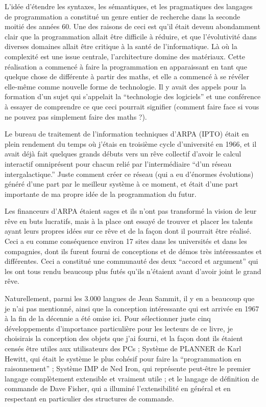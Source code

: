 \documentclass[a4paper,10pt,twoside]{book}
\begin{document}
L'id\'ee d'\'etendre les syntaxes, les s\'emantiques, et les pragmatiques des langages de programmation a constitu\'e un genre entier de recherche dans la seconde moiti\'e des ann\'ees 60. Une des raisons de ceci est qu'il \'etait devenu abondamment clair que la programmation allait \^etre difficile \`a r\'eduire, et que l'\'evolutivit\'e dans diverses domaines allait \^etre critique \`a la sant\'e de l'informatique. L\`a o\`u la complexit\'e est une issue centrale, l'architecture domine des mat\'eriaux. Cette r\'ealisation a commenc\'e \`a faire la programmation en apparaissant en tant que quelque chose de diff\'erente \`a partir des maths, et elle a commenc\'e \`a se r\'ev\'eler elle-m\^eme comme nouvelle forme de technologie. Il y avait des appels pour la formation d'un sujet qui s'appelait la ``technologie des logiciels'' et une conf\'erence \`a essayer de comprendre ce que ceci pourrait signifier (comment faire face si vous ne pouvez pas simplement faire des maths ?).


Le bureau de traitement de l'information techniques d'ARPA (IPTO) \'etait en plein rendement du temps o\`u j'\'etais en troisi\`eme cycle d'universit\'e en 1966, et il avait d\'ej\`a fait quelques grands d\'ebuts vers un r\^eve collectif d'avoir le calcul interactif omnipr\'esent pour chacun reli\'e par l'interm\'ediaire ``d'un r\'eseau intergalactique.'' Juste comment cr\'eer ce r\'eseau (qui a eu d'\'enormes \'evolutions) g\'en\'er\'e d'une part par le meilleur syst\`eme \`a ce moment, et \'etait d'une part importante de ma propre id\'ee de la programmation du futur.

Les financeurs d'ARPA \'etaient sages et ils n'ont pas transform\'e la vision de leur r\^eve en buts lucratifs, mais \`a la place ont essay\'e de trouver et placer les talents ayant leurs propres id\'ees sur ce r\^eve et de la fa\c con dont il pourrait \^etre r\'ealis\'e. Ceci a eu comme cons\'equence environ 17 sites dans les universit\'es et dans les compagnies, dont ils  furent fourni de conceptions et de d\'emos tr\`es int\'eressantes et diff\'erentes. Ceci a constitu\'e une communaut\'e  des deux ``accord et argument'' qui les ont tous rendu beaucoup plus fut\'es qu'ils n'\'etaient avant d'avoir joint le grand r\^eve.

Naturellement, parmi les 3.000 langues de Jean Sammit, il y en a beaucoup que je n'ai pas mentionn\'e, ainsi que la conception int\'eressante qui est arriv\'ee en 1967 \`a la fin de la d\'ecennie a \'et\'e omise ici. Pour s\'electionner juste cinq d\'eveloppements d'importance particuli\`ere pour les lecteurs de ce livre, je choisirais la conception des objets que j'ai fourni, et la fa\c con dont ils \'etaient cens\'es \^etre utiles aux utilisateurs des PCs ; Syst\`eme de PLANNER de Karl Hewitt, qui \'etait le syst\`eme le plus coh\'esif pour faire la ``programmation en raisonnement'' ; Syst\`eme IMP de Ned Iron, qui repr\'esente peut-\^etre le premier langage compl\`etement extensible et vraiment utile ; et le langage de d\'efinition de commande de Dave Fisher, qui a illumin\'e l'extensibilit\'e en g\'en\'eral et en respectant en particulier des structures de commande.
\end{document}
